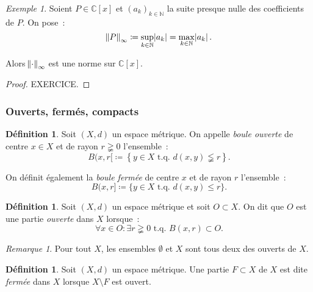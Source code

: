 \documentclass{report}
\theoremstyle{definition}
\newtheorem{déf}[thm]{Définition}
\theoremstyle{remark}
\newtheorem*{rmq}{Remarque}
\newtheorem{ex}{Exemple}[chapter]
\numberwithin{equation}{section}
\newcommand{\C}{\mathbb C}
\newcommand{\N}{\mathbb N}
\newcommand{\tq}{\text{ t.q. }}
\newcommand{\seq}[3]{\left(#1_{#2}\right)_{#2 \in #3}}
\begin{document}
				\begin{ex} Soient $P \in \C[x]$ et $\seq ak\N$ la suite presque nulle des coefficients de $P$. On pose~:
				\begin{equation}
					\norm P_\infty \coloneqq \sup_{k \in \N}\abs {a_k} = \max_{k \in \N}\abs {a_k}.
				\end{equation}

				Alors $\norm \cdot_\infty$ est une norme sur $\C[x]$.
				\end{ex}

				\begin{proof} EXERCICE.
				\end{proof}

			\subsubsection{Ouverts, fermés, compacts}
				\begin{déf} Soit $(X, d)$ un espace métrique. On appelle \textit{boule ouverte} de centre $x \in X$ et de rayon $r \gneqq 0$ l'ensemble~:
				\begin{equation}
					B(x, r[ \coloneqq \left\{y \in X \tq d(x, y) \lneqq r\right\}.
				\end{equation}

				On définit également la \textit{boule fermée} de centre $x$ et de rayon $r$ l'ensemble~:
				\begin{equation}
					B(x, r] \coloneqq \{y \in X \tq d(x, y) \leq r\}.
				\end{equation}
				\end{déf}

				\begin{déf} Soit $(X, d)$ un espace métrique et soit $O \subset X$. On dit que $O$ est une partie \textit{ouverte} dans $X$ lorsque~:
				\begin{equation}
					\forall x \in O : \exists r \gneqq 0 \tq B(x, r)  \subset O.
				\end{equation}
				\end{déf}

				\begin{rmq} Pour tout $X$, les ensembles $\emptyset$ et $X$ sont tous deux des ouverts de $X$. \end{rmq}

				\begin{déf} Soit $(X, d)$ un espace métrique. Une partie $F \subset X$  de $X$ est dite \textit{fermée} dans $X$ lorsque $X \setminus F$
				est ouvert. \end{déf}
\end{document}
